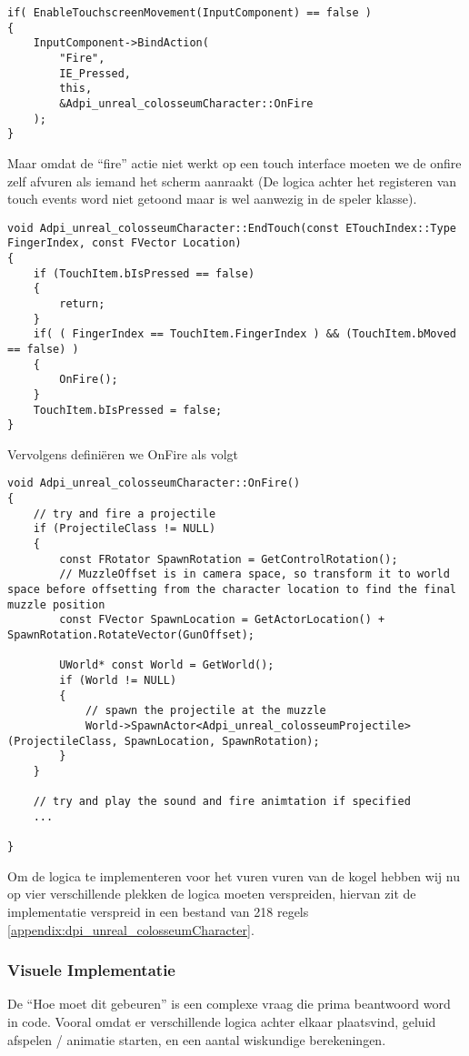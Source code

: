 \begin{lstlisting}[caption=Koppellen van de Fire actie aan de OndFire functie]
if( EnableTouchscreenMovement(InputComponent) == false )
{
	InputComponent->BindAction(
		"Fire", 
		IE_Pressed, 
		this, 
		&Adpi_unreal_colosseumCharacter::OnFire
	);
}
\end{lstlisting}
Maar omdat de “fire” actie niet werkt op een touch interface moeten we de onfire zelf afvuren als iemand het scherm aanraakt (De logica achter het registeren van touch events word niet getoond maar is wel aanwezig in de speler klasse).

\begin{lstlisting}[caption=Aanroepen van de OnFire functie tijdens het EndTouch event]
void Adpi_unreal_colosseumCharacter::EndTouch(const ETouchIndex::Type FingerIndex, const FVector Location)
{
	if (TouchItem.bIsPressed == false)
	{
		return;
	}
	if( ( FingerIndex == TouchItem.FingerIndex ) && (TouchItem.bMoved == false) )
	{
		OnFire();
	}
	TouchItem.bIsPressed = false;
}
\end{lstlisting}
Vervolgens definiëren we OnFire als volgt

\begin{lstlisting}[caption=Implementatie van de OnFire functie]
void Adpi_unreal_colosseumCharacter::OnFire()
{ 
	// try and fire a projectile
	if (ProjectileClass != NULL)
	{
		const FRotator SpawnRotation = GetControlRotation();
		// MuzzleOffset is in camera space, so transform it to world space before offsetting from the character location to find the final muzzle position
		const FVector SpawnLocation = GetActorLocation() + SpawnRotation.RotateVector(GunOffset);

		UWorld* const World = GetWorld();
		if (World != NULL)
		{
			// spawn the projectile at the muzzle
			World->SpawnActor<Adpi_unreal_colosseumProjectile>(ProjectileClass, SpawnLocation, SpawnRotation);
		}
	}

	// try and play the sound and fire animtation if specified
	...

}
\end{lstlisting}
Om de logica te implementeren voor het vuren vuren van de kogel hebben wij nu op vier verschillende plekken de logica moeten verspreiden, hiervan zit de implementatie verspreid in een bestand van 218 regels \ref{appendix:dpi_unreal_colosseumCharacter}.

\subsubsection{Visuele Implementatie}
De “Hoe moet dit gebeuren” is een complexe vraag die prima beantwoord word in code. Vooral omdat er verschillende logica achter elkaar plaatsvind, geluid afspelen / animatie starten, en een aantal wiskundige berekeningen. 

